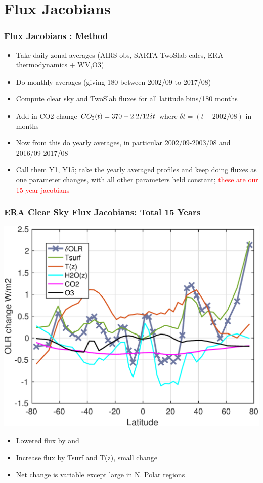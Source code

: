\documentclass[10pt,t]{beamer}
\begin{document}
\section{Flux Jacobians}
\begin{frame}
  \frametitle{Flux Jacobians : Method}
  \begin{itemize}
  \item Take daily zonal averages (AIRS obs, SARTA TwoSlab calcs, ERA thermodynamics + WV,O3)
  \item Do monthly averages (giving 180 between 2002/09 to 2017/08)
  \item Compute clear sky and TwoSlab fluxes for all latitude bins/180 months
  \item Add in CO2 change $CO_2(t) = 370 + 2.2/12 \delta t$ where $\delta t = (t-2002/08)$ in months
  \item Now from this do yearly averages, in particular 2002/09-2003/08 and 2016/09-2017/08
  \item Call them Y1, Y15; take the yearly averaged profiles and keep doing fluxes as one parameter
    changes, with all other parameters held constant; \textcolor{red}{these are our 15 year jacobians}
  \end{itemize}
\end{frame}
\begin{frame}
  \frametitle{ERA Clear Sky Flux Jacobians: Total 15 Years}
  \vspace{-0.1in}
  \begin{center}
    \noindent\includegraphics[width=0.75\linewidth]{clrskly_temp_gas_fluxjacs_lls.pdf}
  \end{center}
  \vspace{-0.1in}
  \begin{itemize}
  \item Lowered flux by \cd and \water
  \item Increase flux by Tsurf and T(z), \ozone small change
  \item Net change is variable except large in N. Polar regions
  \end{itemize}
\end{frame}
\end{document}
